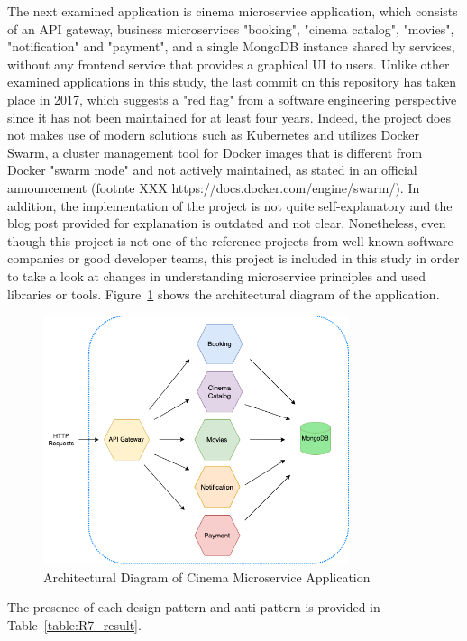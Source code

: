\documentclass{Configuration_Files/PoliMi3i_thesis}
\begin{document}
The next examined application is cinema microservice application, which consists of an API gateway, business microservices "booking", "cinema catalog", "movies", "notification" and "payment", and a single MongoDB instance shared by services, without any frontend service that provides a graphical UI to users.
Unlike other examined applications in this study, the last commit on this repository has taken place in 2017, which suggests a "red flag" from a software engineering perspective since it has not been maintained for at least four years.
Indeed, the project does not makes use of modern solutions such as Kubernetes and utilizes Docker Swarm, a cluster management tool for Docker images that is different from Docker "swarm mode" and not actively maintained, as stated in an official announcement (footnte XXX https://docs.docker.com/engine/swarm/).
In addition, the implementation of the project is not quite self-explanatory and the blog post provided for explanation is outdated and not clear.
Nonetheless, even though this project is not one of the reference projects from well-known software companies or good developer teams, this project is included in this study in order to take a look at changes in understanding microservice principles and used libraries or tools.
Figure~\ref{fig:R7_arch} shows the architectural diagram of the application.

\begin{figure}[H]
\centering
\includegraphics[width=0.8\textwidth]{myImages/R7.png}
\caption{Architectural Diagram of Cinema Microservice Application}
\label{fig:R7_arch}
\end{figure}

The presence of each design pattern and anti-pattern is provided in Table~\ref{table:R7_result}.
\end{document}

